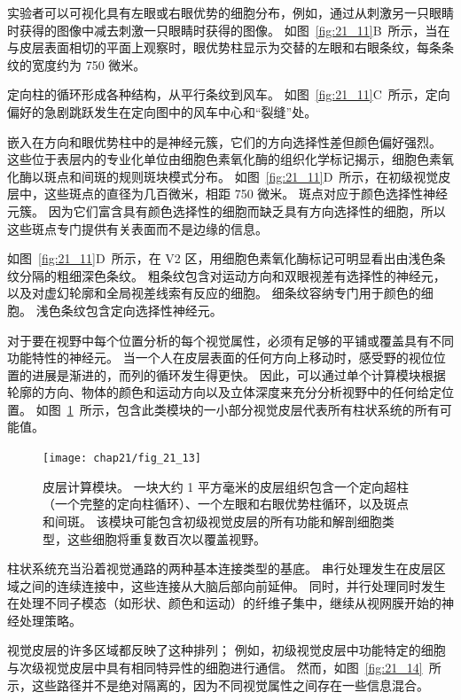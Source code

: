 实验者可以可视化具有左眼或右眼优势的细胞分布，例如，通过从刺激另一只眼睛时获得的图像中减去刺激一只眼睛时获得的图像。 
如图~\ref{fig:21_11}B~所示，当在与皮层表面相切的平面上观察时，眼优势柱显示为交替的左眼和右眼条纹，每条条纹的宽度约为 750 微米。


定向柱的循环形成各种结构，从平行条纹到风车。 
如图~\ref{fig:21_11}C~所示，定向偏好的急剧跳跃发生在定向图中的风车中心和“裂缝”处。


嵌入在方向和眼优势柱中的是神经元簇，它们的方向选择性差但颜色偏好强烈。
这些位于表层内的专业化单位由细胞色素氧化酶的组织化学标记揭示，细胞色素氧化酶以斑点和间斑的规则斑块模式分布。
如图~\ref{fig:21_11}D~所示，在初级视觉皮层中，这些斑点的直径为几百微米，相距 750 微米。
斑点对应于颜色选择性神经元簇。
因为它们富含具有颜色选择性的细胞而缺乏具有方向选择性的细胞，所以这些斑点专门提供有关表面而不是边缘的信息。


如图~\ref{fig:21_11}D~所示，在 V2 区，用细胞色素氧化酶标记可明显看出由浅色条纹分隔的粗细深色条纹。
粗条纹包含对运动方向和双眼视差有选择性的神经元，以及对虚幻轮廓和全局视差线索有反应的细胞。
细条纹容纳专门用于颜色的细胞。
浅色条纹包含定向选择性神经元。


对于要在视野中每个位置分析的每个视觉属性，必须有足够的平铺或覆盖具有不同功能特性的神经元。
当一个人在皮层表面的任何方向上移动时，感受野的视位位置的进展是渐进的，而列的循环发生得更快。
因此，可以通过单个计算模块根据轮廓的方向、物体的颜色和运动方向以及立体深度来充分分析视野中的任何给定位置。
如图~\ref{fig:21_13}~所示，包含此类模块的一小部分视觉皮层代表所有柱状系统的所有可能值。


\begin{figure}[htbp]
	\centering
	\texttt{[image: chap21/fig\_21\_13]}
	\caption{皮层计算模块。 
		一块大约 1 平方毫米的皮层组织包含一个定向超柱（一个完整的定向柱循环）、一个左眼和右眼优势柱循环，以及斑点和间斑。
		该模块可能包含初级视觉皮层的所有功能和解剖细胞类型，这些细胞将重复数百次以覆盖视野\cite{hubel1995eye}。}
	\label{fig:21_13}
\end{figure}


柱状系统充当沿着视觉通路的两种基本连接类型的基底。
串行处理发生在皮层区域之间的连续连接中，这些连接从大脑后部向前延伸。
同时，并行处理同时发生在处理不同子模态（如形状、颜色和运动）的纤维子集中，继续从视网膜开始的神经处理策略。


视觉皮层的许多区域都反映了这种排列；
例如，初级视觉皮层中功能特定的细胞与次级视觉皮层中具有相同特异性的细胞进行通信。
然而，如图~\ref{fig:21_14}~所示，这些路径并不是绝对隔离的，因为不同视觉属性之间存在一些信息混合。


